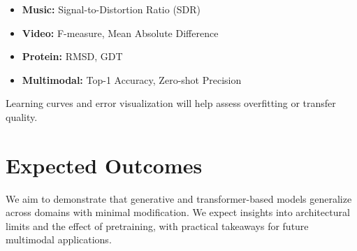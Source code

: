 \documentclass{article}
\begin{document}
\begin{itemize}
    \item \textbf{Music:} Signal-to-Distortion Ratio (SDR)
    \item \textbf{Video:} F-measure, Mean Absolute Difference
    \item \textbf{Protein:} RMSD, GDT
    \item \textbf{Multimodal:} Top-1 Accuracy, Zero-shot Precision
\end{itemize}

Learning curves and error visualization will help assess overfitting or transfer quality.

\section{Expected Outcomes}

We aim to demonstrate that generative and transformer-based models generalize across domains with minimal modification. We expect insights into architectural limits and the effect of pretraining, with practical takeaways for future multimodal applications.



\end{document}
